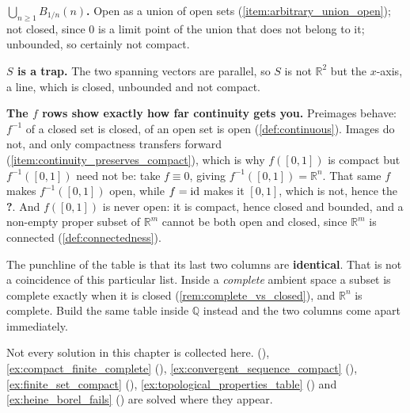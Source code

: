 \begin{exercisesolution}[Solution to \cref{ex:classification_table}]
\textbf{$\bigcup_{n\geq1}B_{1/n}(n)$.} Open as a union of open sets
(\cref{item:arbitrary_union_open}); not closed, since $0$ is a limit point of the union that does
not belong to it; unbounded, so certainly not compact.

\textbf{$S$ is a trap.} The two spanning vectors are parallel, so $S$ is not $\mathbb{R}^2$ but
the $x$-axis, a line, which is closed, unbounded and not compact.

\textbf{The $f$ rows show exactly how far continuity gets you.} Preimages behave: $f^{-1}$ of a
closed set is closed, of an open set is open (\cref{def:continuous}). Images do not, and only
compactness transfers forward (\cref{item:continuity_preserves_compact}), which is why
$f([0,1])$ is compact but $f^{-1}([0,1])$ need not be: take $f \equiv 0$, giving
$f^{-1}([0,1]) = \mathbb{R}^n$. That same $f$ makes $f^{-1}([0,1])$ open, while $f = \operatorname{id}$ makes
it $[0,1]$, which is not, hence the \textbf{?}. And $f([0,1])$ is never open: it is compact,
hence closed and bounded, and a non-empty proper subset of $\mathbb{R}^m$ cannot be both open
and closed, since $\mathbb{R}^m$ is connected (\cref{def:connectedness}).

\begin{remark}
The punchline of the table is that its last two columns are \textbf{identical}. That is not a
coincidence of this particular list. Inside a \emph{complete} ambient space a subset is complete
exactly when it is closed (\cref{rem:complete_vs_closed}), and $\mathbb{R}^n$ is complete. Build
the same table inside $\mathbb{Q}$ instead and the two columns come apart immediately.
\end{remark}
\end{exercisesolution}

Not every solution in this chapter is collected here. 
(), \cref{ex:compact_finite_complete}
(), \cref{ex:convergent_sequence_compact}
(), \cref{ex:finite_set_compact}
(), \cref{ex:topological_properties_table}
() and \cref{ex:heine_borel_fails}
() are solved where they appear.


